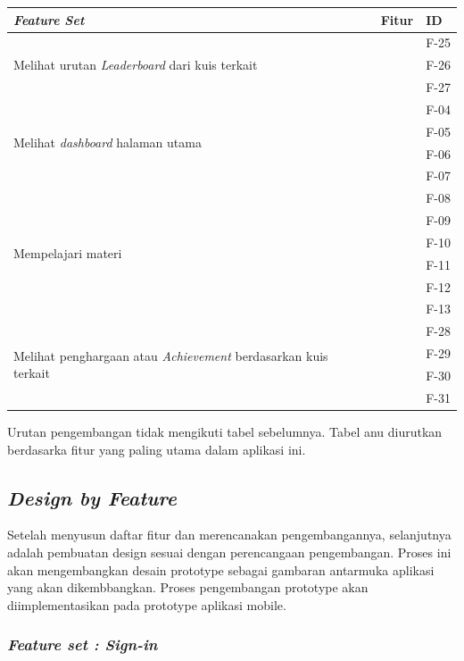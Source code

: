 \begin{table}[H]
	\begin{tabular}{|m{3cm}|p{}|p{1.5cm}|}
		\hline
		\centering\textbf{\textit{Feature Set}} & \centering\textbf{Fitur} & \multicolumn{1}{m{1.5cm}|}{\centering \textbf{ID}} \\
		\hline
		\multirow{3}{3cm}{Melihat urutan \textit{Leaderboard} dari kuis terkait} & & F-25 \\
		\cline{2-3}
		& & F-26 \\
		\cline{2-3}
		& & F-27 \\
		\hline
		\multirow{4}{2.5cm}{Melihat \textit{dashboard} halaman utama} & & F-04 \\
		\cline{2-3}
		& & F-05 \\
		\cline{2-3}
		& & F-06 \\
		\cline{2-3}
		& & F-07 \\
		\hline
		\multirow{6}{2.5cm}{Mempelajari materi} & & F-08 \\
		\cline{2-3}
		& & F-09 \\
		\cline{2-3}
		& & F-10 \\
		\cline{2-3}
		& & F-11 \\
		\cline{2-3}
		& & F-12 \\
		\cline{2-3}
		& & F-13 \\
		\hline
		\multirow{4}{3cm}{Melihat penghargaan atau \textit{Achievement} berdasarkan kuis terkait} & & F-28 \\
		\cline{2-3}
		& & F-29 \\
		\cline{2-3}
		& & F-30 \\
		\cline{2-3}
		& & F-31 \\
		\hline
	\end{tabular}
\end{table}
Urutan pengembangan tidak mengikuti tabel sebelumnya. Tabel anu diurutkan berdasarka fitur yang paling utama dalam aplikasi ini.
\subsection{\textit{Design by Feature}}
Setelah menyusun daftar fitur dan merencanakan pengembangannya, selanjutnya adalah pembuatan design sesuai dengan perencangaan pengembangan.
Proses ini akan mengembangkan desain prototype sebagai gambaran antarmuka aplikasi yang akan dikembbangkan. Proses pengembangan prototype akan diimplementasikan pada prototype aplikasi mobile.

\subsubsection{\textit{Feature set : Sign-in}}
